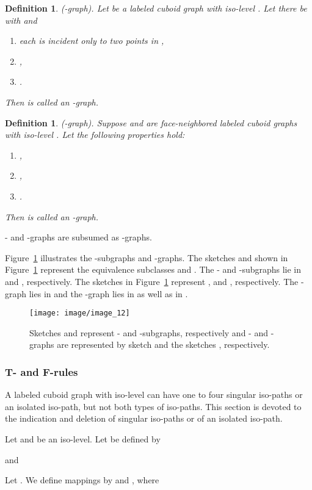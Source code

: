 \documentclass[a4paper,11pt]{article}
\newtheorem{definition}[theorem]{Definition}
\begin{document}
\begin{definition}(-graph). Let  be a labeled cuboid graph
with iso-level . Let there be  with  and
\begin{enumerate}
\item each  is incident only to two points in ,
\item ,
\item .
\end{enumerate}
Then  is called an -graph.
\label{def:iso-path-4}
\end{definition}

\begin{definition}(-graph). Suppose  and 
are face-neighbored labeled cuboid graphs with iso-level . Let the following properties hold:
\begin{enumerate}
\item ,
\item ,
\item .
\end{enumerate}
Then  is called an -graph.
\label{def:iso-path-5}
\end{definition}
\noindent - and -graphs are subsumed as -graphs.

Figure~\ref{image_12} illustrates the -subgraphs and -graphs. The sketches  and 
shown in Figure~\ref{image_12} represent the equivalence subclasses  and
. The - and -subgraphs lie in  and ,
respectively. The sketches  in Figure~\ref{image_12} represent ,
 and , respectively. The -graph lies in 
and the -graph lies in  as well as in .
\begin{figure}[!ht]
\texttt{[image: image/image\_12]}
\caption{Sketches  and  represent - and -subgraphs, respectively and -
and -graphs are represented by sketch  and the sketches , respectively.}
\label{image_12}
\end{figure}

\subsubsection{T- and F-rules}
A labeled cuboid graph  with iso-level  can have
one to four singular iso-paths or an isolated iso-path, but not both types of iso-paths. This section
is devoted to the indication and deletion of singular iso-paths or of an isolated iso-path.

Let  and  be an iso-level. Let
 be defined by

and

Let . We define mappings  by
 and , where
\end{document}
